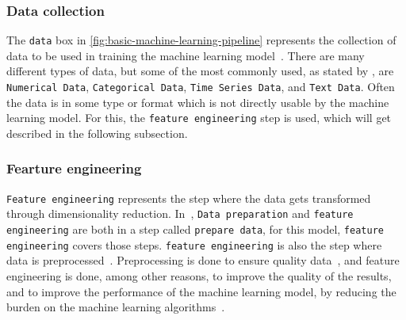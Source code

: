 

\subsubsection{Data collection}\label{subsubsec:machine-learning-pipeline-data-collection}
The \texttt{data} box in \autoref{fig:basic-machine-learning-pipeline} represents the collection of data to be used in training the machine learning model~\cite{machine-learning-pipeline-architecture}. There are many different types of data, but some of the most commonly used, as stated by \cite{the-importance-of-machine-learning-data}, are \texttt{Numerical Data}, \texttt{Categorical Data}, \texttt{Time Series Data}, and \texttt{Text Data}. Often the data is in some type or format which is not directly usable by the machine learning model. For this, the \texttt{feature engineering} step is used, which will get described in the following subsection.

\subsubsection{Fearture engineering}\label{subsubsec:machine-learning-pipeline-feature-engineering}
\texttt{Feature engineering} represents the step where the data gets transformed through dimensionality reduction. In~\cite{machine-learning-pipeline-architecture}, \texttt{Data preparation} and \texttt{feature engineering} are both in a step called \texttt{prepare data}, for this model, \texttt{feature engineering} covers those steps. \texttt{feature engineering} is also the step where data is preprocessed~\cite{machine-learning-pipeline-architecture}. Preprocessing is done to ensure quality data~\cite{data-preparation-for-data-mining}, and feature engineering is done, among other reasons, to improve the quality of the results, and to improve the performance of the machine learning model, by reducing the burden on the machine learning algorithms~\cite{dimensionality-reduction-reddy}.


